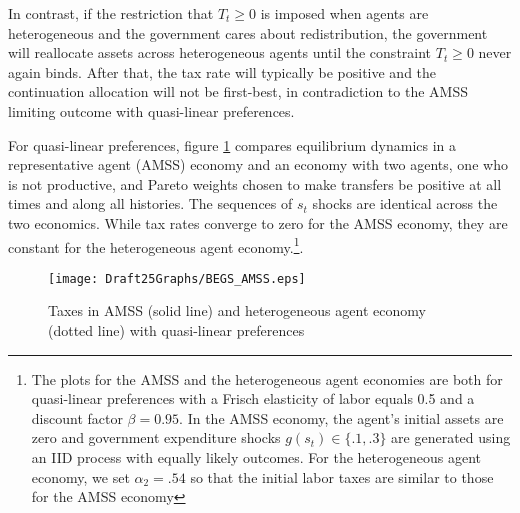\documentclass[thmsb,11pt]{article}
\begin{document}
In contrast, if the restriction that $T_t \geq 0$ is imposed when agents are heterogeneous and the
government cares about redistribution,  the government will reallocate assets across  heterogeneous agents until the constraint $T_t \geq 0$ never again binds.  After that, the tax rate will typically be positive and the
continuation allocation will not be  first-best, in contradiction to the AMSS limiting outcome with quasi-linear preferences.

For quasi-linear preferences, figure \ref{fig: AMSS vs BEGS} compares equilibrium dynamics in a
representative agent (AMSS) economy and an economy with two agents, one who
is not productive, and  Pareto weights chosen to make
transfers be positive at all times  and along all  histories. The sequences of $s_t$ shocks are identical across the two economics.
 While tax rates converge to zero for the AMSS economy, they are constant for the heterogeneous agent economy.\footnote{The plots for the AMSS and the heterogeneous agent economies are both  for quasi-linear preferences with a Frisch elasticity of labor equals 0.5 and a discount factor $\beta=0.95$. In the AMSS economy,  the agent's  initial assets are zero  and  government expenditure shocks $g(s_t) \in\{.1,.3\}$ are generated using an IID process with equally likely outcomes.  For the heterogeneous agent economy, we set  $\alpha_2=.54$ so that the initial labor taxes are similar to those for the AMSS economy}. %



  \begin{figure}[htp]
 \centering
 \texttt{[image: Draft25Graphs/BEGS\_AMSS.eps]}
 \caption{ Taxes in AMSS (solid line) and heterogeneous agent economy (dotted line) with quasi-linear preferences}
 \label{fig: AMSS vs BEGS}
 \end{figure}
\end{document}
